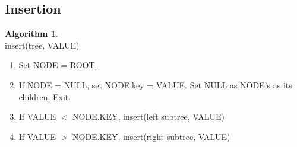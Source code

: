 \documentclass[10pt, a4paper]{extarticle}
\theoremstyle{definition}
\newtheorem{alg}{Algorithm}
\begin{document}
	\subsection{Insertion}
	\begin{alg}\hfill\\
		insert(tree, VALUE)
		\begin{enumerate}
			\item Set NODE = ROOT.
			\item If NODE = NULL, set NODE.key = VALUE. Set NULL as NODE's as its children. Exit.
			\item If VALUE $<$ NODE.KEY, insert(left subtree, VALUE)
			\item If VALUE $>$ NODE.KEY, insert(right subtree, VALUE)
	\end{enumerate}
	\end{alg}
\end{document}
